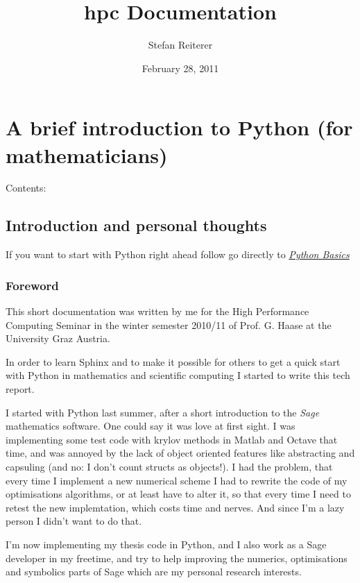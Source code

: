 \documentclass[letterpaper,10pt,english]{manual}
\title{hpc Documentation}
\date{February 28, 2011}
\author{Stefan Reiterer}
\begin{document}
\maketitle
\tableofcontents
\hypertarget{--doc-index}{}



\chapter{A brief introduction to Python (for mathematicians)}

Contents:

\resetcurrentobjects
\hypertarget{--doc-Introduction}{}

\section{Introduction and personal thoughts}

If you want to start with Python right ahead  follow go directly to \hyperlink{basics-ref}{\emph{Python Basics}}


\subsection{Foreword}

This short documentation was written by me for the High Performance Computing Seminar
in the winter semester 2010/11 of Prof. G. Haase at the University Graz Austria.

In order to learn Sphinx and to make it possible for others to get a
quick start with Python in mathematics and scientific computing I started to write this tech report.

I started with Python last summer, after a short introduction to the \emph{Sage} mathematics software. One could
say it was love at first sight. I was implementing some test code with krylov methods in Matlab and Octave that
time, and was annoyed by the lack of object oriented features like
abstracting and capsuling (and no: I don't count structs as objects!). I had the problem, that
every time I implement a new numerical scheme I had to rewrite the code of my optimisations algorithms, or at least have
to alter it, so that every time I need to retest the new implemtation, which costs time and nerves. And since I'm a
lazy person I didn't want to do that.

I'm now implementing my thesis code in Python, and I also work as a Sage developer in my freetime, and try to help
improving the numerics, optimisations and symbolics parts of Sage which are my personal research interests.
\end{document}
